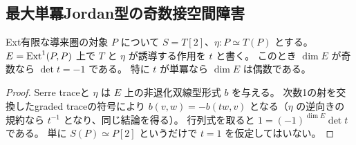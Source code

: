 \subsection{最大単冪Jordan型の奇数接空間障害}
\label{subsec:cubic-principal-unipotent-vertex}
\begin{lemma}
\label{lem:cubic-odd-Serre-determinant}
Ext有限な導来圏の対象 $P$ について $S=T[2]$、$\eta:P\simeq T(P)$ とする。
$E=\operatorname{Ext}^1(P,P)$ 上で $T$ と $\eta$ が誘導する作用を $t$ と書く。
このとき $\dim E$ が奇数なら $\det t=-1$ である。
特に $t$ が単冪なら $\dim E$ は偶数である。
\end{lemma}
\begin{proof}
Serre traceと $\eta$ は $E$ 上の非退化双線型形式 $b$ を与える。
次数1の射を交換したgraded traceの符号により
$b(v,w)=-b(tw,v)$ となる（$\eta$ の逆向きの規約なら $t^{-1}$ となり、同じ結論を得る）。
行列式を取ると $1=(-1)^{\dim E}\det t$ である。
単に $S(P)\simeq P[2]$ というだけで $t=1$ を仮定してはいない。
\end{proof}

